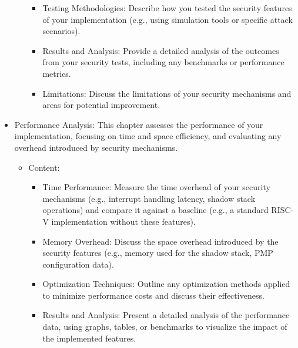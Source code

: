 \begin{itemize}
\begin{itemize}
\begin{itemize}
          \item Testing Methodologies: Describe how you tested the security
            features of your implementation (e.g., using simulation tools or specific
            attack scenarios).

          \item Results and Analysis: Provide a detailed analysis of the
            outcomes from your security tests, including any benchmarks or performance
            metrics.

          \item Limitations: Discuss the limitations of your security mechanisms
            and areas for potential improvement.
        \end{itemize}
    \end{itemize}

  \item Performance Analysis: This chapter assesses the performance of your
    implementation, focusing on time and space efficiency, and evaluating any
    overhead introduced by security mechanisms.

    \begin{itemize}
      \item Content:
        \begin{itemize}
          \item Time Performance: Measure the time overhead of your security
            mechanisms (e.g., interrupt handling latency, shadow stack
            operations) and compare it against a baseline (e.g., a standard RISC-V
            implementation without these features).

          \item Memory Overhead: Discuss the space overhead introduced by the
            security features (e.g., memory used for the shadow stack, PMP
            configuration data).

          \item Optimization Techniques: Outline any optimization methods
            applied to minimize performance costs and discuss their
            effectiveness.

          \item Results and Analysis: Present a detailed analysis of the
            performance data, using graphs, tables, or benchmarks to visualize the
            impact of the implemented features.
        \end{itemize}
    \end{itemize}


\end{itemize}

